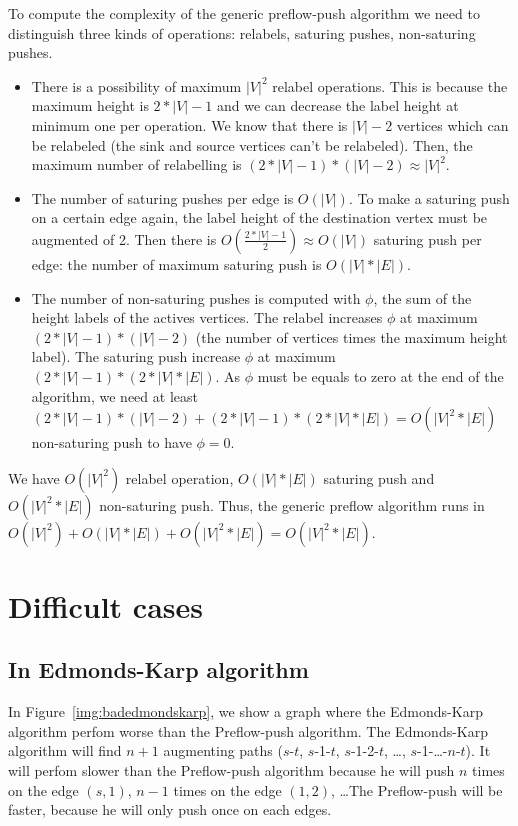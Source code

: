 To compute the complexity of the generic preflow-push algorithm we need to distinguish three kinds of operations: relabels, saturing pushes, non-saturing pushes.
\begin{itemize}
\item There is a possibility of maximum $|V|^2$ relabel operations. This is because the maximum height is $2*|V| - 1$ and we can decrease the label height at minimum one per operation. We know that there is $|V| - 2$ vertices which can be relabeled (the sink and source vertices can't be relabeled). Then, the maximum number of relabelling is $(2*|V| - 1) * (|V| - 2) \approx |V|^2$.

\item The number of saturing pushes per edge is $O(|V|)$. To make a saturing push on a certain edge again, the label height of the destination vertex must be augmented of 2. Then there is $O(\frac{2*|V| - 1}{2}) \approx O(|V|)$ saturing push per edge: the number of maximum saturing push is $O(|V|*|E|)$.

\item The number of non-saturing pushes is computed with $\phi$, the sum of the height labels of the actives vertices. The relabel increases $\phi$ at maximum $(2*|V| - 1)*(|V|-2)$ (the number of vertices times the maximum height label). The saturing push increase $\phi$ at maximum $(2*|V|-1)*(2*|V|*|E|)$. As $\phi$ must be equals to zero at the end of the algorithm, we need at least $(2*|V|-1)*(|V|-2) + (2*|V|-1)*(2*|V|*|E|) = O(|V|^2*|E|)$ non-saturing push to have $\phi = 0$.
\end{itemize}
We have $O(|V|^2)$ relabel operation, $O(|V|*|E|)$ saturing push and $O(|V|^2*|E|)$ non-saturing push. Thus, the generic preflow algorithm runs in $O(|V|^2) + O(|V|*|E|) + O(|V|^2*|E|) = O(|V|^2 *|E|)$. 

\section{Difficult cases}

\subsection{In Edmonds-Karp algorithm}

In Figure~\ref{img:badedmondskarp}, we show a graph where the Edmonds-Karp algorithm perfom worse than the Preflow-push algorithm.  The Edmonds-Karp algorithm will find $n+1$ augmenting paths ($s$-$t$, $s$-1-$t$, $s$-1-2-$t$, \dots, $s$-1-\dots-$n$-$t$). It will perfom slower than the Preflow-push algorithm because he will push $n$ times on the edge $(s, 1)$, $n-1$ times on the edge $(1, 2)$, \dots The Preflow-push will be faster, because he will only push once on each edges.

